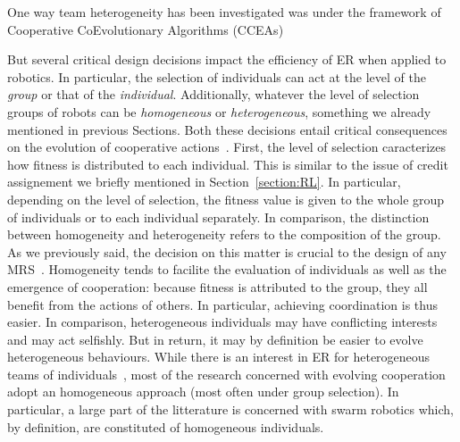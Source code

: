     One way team heterogeneity has been investigated was under the framework of Cooperative CoEvolutionary Algorithms (CCEAs)





  But several critical design decisions impact the efficiency of ER when applied to robotics. In particular, the selection of individuals can act at the level of the \emph{group} or that of the \emph{individual}. Additionally, whatever the level of selection groups of robots can be \emph{homogeneous} or \emph{heterogeneous}, something we already mentioned in previous Sections. Both these decisions entail critical consequences on the evolution of cooperative actions~\parencite{Waibel2009}. First, the level of selection caracterizes how fitness is distributed to each individual. This is similar to the issue of credit assignement we briefly mentioned in Section~\ref{section:RL}. In particular, depending on the level of selection, the fitness value is given to the whole group of individuals or to each individual separately. In comparison, the distinction between homogeneity and heterogeneity refers to the composition of the group. As we previously said, the decision on this matter is crucial to the design of any MRS~\parencite{Quinn2003}. Homogeneity tends to facilite the evaluation of individuals as well as the emergence of cooperation: because fitness is attributed to the group, they all benefit from the actions of others. In particular, achieving coordination is thus easier. In comparison, heterogeneous individuals may have conflicting interests and may act selfishly. But in return, it may by definition be easier to evolve heterogeneous behaviours. While there is an interest in ER for heterogeneous teams of individuals~\parencite{Lichocki2013}, most of the research concerned with evolving cooperation adopt an homogeneous approach (most often under group selection). In particular, a large part of the litterature is concerned with swarm robotics which, by definition, are constituted of homogeneous individuals.





